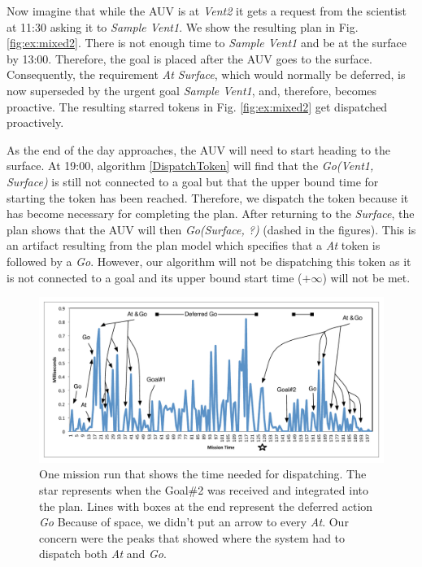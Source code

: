 Now imagine that while the AUV is at {\em Vent2} it gets a request
from the scientist at 11:30 asking it to {\em Sample Vent1}. We show
the resulting plan in Fig. \ref{fig:ex:mixed2}. There is not enough
time to {\em Sample Vent1} and be at the surface by 13:00. Therefore,
the goal is placed after the AUV goes to the surface.  Consequently,
the requirement {\em At Surface}, which would normally be deferred, is
now superseded by the urgent goal {\em Sample Vent1}, and, therefore,
becomes proactive. The resulting starred tokens in
Fig. \ref{fig:ex:mixed2} get dispatched proactively.

As the end of the day approaches, the AUV will need to start heading
to the surface. At 19:00, algorithm \ref{DispatchToken} will find that
the {\em Go(Vent1, Surface)} is still not connected to a goal but that
the upper bound time for starting the token has been
reached. Therefore, we dispatch the token because it has become
necessary for completing the plan.  After returning to the {\em
  Surface}, the plan shows that the AUV will then {\em Go(Surface, ?)}
(dashed in the figures). This is an artifact resulting from the plan
model which specifies that a {\em At} token is followed by a {\em Go}.
However, our algorithm will not be dispatching this token as it is not
connected to a goal and its upper bound start time ($+\infty$) will
not be met.

\begin{figure}[!htbp]
  \centering
  \includegraphics[width=\columnwidth]{figs/example_run.pdf}
  \caption{\small One mission run that shows the time needed for
    dispatching. The star represents when the Goal\#2 was received and
    integrated into the plan. Lines with boxes at the end represent
    the deferred action {\em Go} Because of space, we didn't put an
    arrow to every {\em At}. Our concern were the peaks that showed
    where the system had to dispatch both {\em At} and {\em Go}. }
  \label{fig:example_run}
\end{figure}

